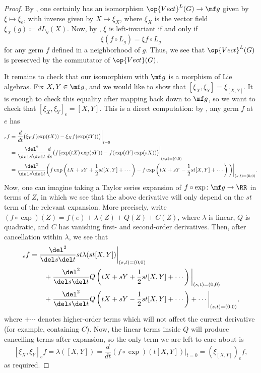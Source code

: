 \documentclass[../notes.tex]{subfiles}
\begin{document}
\begin{proof}
	By , one certainly has an isomorphism $\op{Vect}^L(G)\to\mf g$ given by $\xi\mapsto\xi_e$, with inverse given by $X\mapsto\xi_X$, where $\xi_X$ is the vector field $\xi_X(g)\coloneqq dL_g(X)$. Now, by , $\xi$ is left-invariant if and only if
	\[\xi(f\circ L_g)=\xi f\circ L_g\]
	for any germ $f$ defined in a neighborhood of $g$. Thus, we see that $\op{Vect}^L(G)$ is preserved by the commutator of $\op{Vect}(G)$.
	
	It remains to check that our isomorphism with $\mf g$ is a morphism of Lie algebras. Fix $X,Y\in\mf g$, and we would like to show that $[\xi_X,\xi_Y]=\xi_{[X,Y]}$. It is enough to check this equality after mapping back down to $\mf g$, so we want to check that $[\xi_X,\xi_Y]_e=[X,Y]$. This is a direct computation: by , any germ $f$ at $e$ has
	\begin{align*}
		[\xi_X,\xi_Y]_ef &= \frac d{dt}\big(\xi_Yf(\exp(tX))-\xi_Xf(\exp(tY))\big)\bigg|_{t=0} \\
		&= \frac{\del^2}{\del s\del t}\frac d{ds}\big(f(\exp(tX)\exp(sY))-f(\exp(tY)\exp(sX))\big)\bigg|_{(s,t)=(0,0)} \\
		&= \frac{\del^2}{\del s\del t}\bigg(f\exp\left(tX+sY+\frac12st[X,Y]+\cdots\right)-f\exp\left(tX+sY-\frac12st[X,Y]+\cdots\right)\bigg)\bigg|_{(s,t)=(0,0)}.
	\end{align*}
	Now, one can imagine taking a Taylor series expansion of $f\circ\exp\colon\mf g\to\RR$ in terms of $Z$, in which we see that the above derivative will only depend on the $st$ term of the relevant expansion. More precisely, write $(f\circ\exp)(Z)=f(e)+\lambda(Z)+Q(Z)+C(Z)$, where $\lambda$ is linear, $Q$ is quadratic, and $C$ has vanishing first- and second-order derivatives. Then, after cancellation within $\lambda$, we see that
	\begin{align*}
		[\xi_X,\xi_Y]_ef &= \frac{\del^2}{\del s\del t}st\lambda(st[X,Y])\bigg|_{(s,t)=(0,0)} \\
		&\qquad+\frac{\del^2}{\del s\del t}Q\left(tX+sY+\frac12st[X,Y]+\cdots\right)\bigg|_{(s,t)=(0,0)} \\
		&\qquad+\frac{\del^2}{\del s\del t}Q\left(tX+sY-\frac12st[X,Y]+\cdots\right)+\cdots\bigg|_{(s,t)=(0,0)},
	\end{align*}
	where $+\cdots$ denotes higher-order terms which will not affect the current derivative (for example, containing $C$). Now, the linear terms inside $Q$ will produce cancelling terms after expansion, so the only term we are left to care about is
	\[[\xi_X,\xi_Y]_ef=\lambda([X,Y])=\frac d{dt}(f\circ\exp)(t[X,Y])\bigg|_{t=0}=(\xi_{[X,Y]})_ef,\]
	as required.
\end{proof}
\end{document}
